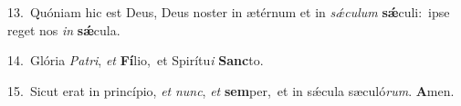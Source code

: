 {\numbfont\textcolor{\numbcolor}{13.}}~Quóniam hic est Deus, Deus noster in ætérnum et in \textit{sǽ}\-\textit{cu}\textit{lum} \textbf{sǽ}\-culi:~\star ipse reget nos \textit{in} \textbf{sǽ}\-cula.\par
{\numbfont\textcolor{\numbcolor}{14.}}~Glória \textit{Pa}\-\textit{tri}, \textit{et} \textbf{Fí}\-lio,~\star et Spirítu\textit{i} \textbf{Sanc}\-to.\par
{\numbfont\textcolor{\numbcolor}{15.}}~Sicut erat in princípio, \textit{et} \textit{nunc}\-, \textit{et} \textbf{sem}\-per,~\star et in sǽcula sæculó\-\textit{rum}\-. \textbf{A}\-men.\par
